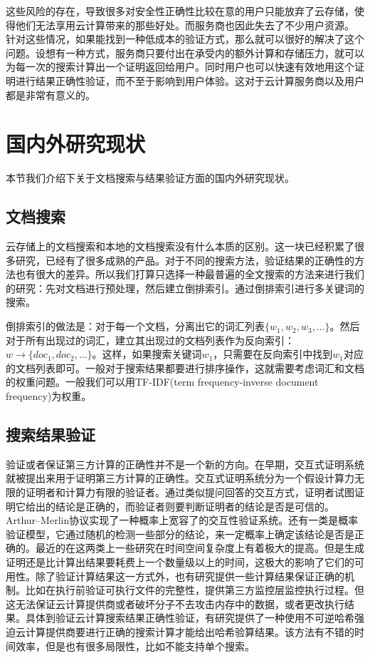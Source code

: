 这些风险的存在，导致很多对安全性正确性比较在意的用户只能放弃了云存储，使得他们无法享用云计算带来的那些好处。而服务商也因此失去了不少用户资源。
针对这些情况，如果能找到一种低成本的验证方式，那么就可以很好的解决了这个问题。设想有一种方式，服务商只要付出在承受内的额外计算和存储压力，就可以为每一次的搜索计算出一个证明返回给用户。同时用户也可以快速有效地用这个证明进行结果正确性验证，而不至于影响到用户体验。这对于云计算服务商以及用户都是非常有意义的。

\section{国内外研究现状}
本节我们介绍下关于文档搜索与结果验证方面的国内外研究现状。

\subsection{文档搜索}
云存储上的文档搜索和本地的文档搜索没有什么本质的区别。这一块已经积累了很多研究，已经有了很多成熟的产品。对于不同的搜索方法，验证结果的正确性的方法也有很大的差异。所以我们打算只选择一种最普遍的全文搜索的方法来进行我们的研究：先对文档进行预处理，然后建立倒排索引。通过倒排索引进行多关键词的搜索。

倒排索引的做法是：对于每一个文档，分离出它的词汇列表$\{w_1,w_2,w_3,...\}$。然后对于所有出现过的词汇，建立其出现过的文档列表作为反向索引：$w \to \{doc_1,doc_2,...\}$。这样，如果搜索关键词$w_1$，只需要在反向索引中找到$w_1$对应的文档列表即可。一般对于搜索结果都要进行排序操作，这就需要考虑词汇和文档的权重问题。一般我们可以用TF-IDF(term frequency-inverse document frequency)为权重。
\subsection{搜索结果验证}
验证或者保证第三方计算的正确性并不是一个新的方向。在早期，交互式证明系统就被提出来用于证明第三方计算的正确性。交互式证明系统分为一个假设计算力无限的证明者和计算力有限的验证者。通过类似提问回答的交互方式，证明者试图证明它给出的结论是正确的，而验证者则要判断证明者的结论是否是可信的。Arthur–Merlin协议实现了一种概率上宽容了的交互性验证系统。还有一类是概率验证模型，它通过随机的检测一些部分的结论，来一定概率上确定该结论是否是正确的。最近的在这两类上一些研究在时间空间复杂度上有着极大的提高。但是生成证明还是比计算出结果要耗费上一个数量级以上的时间，这极大的影响了它们的可用性。除了验证计算结果这一方式外，也有研究提供一些计算结果保证正确的机制。比如在执行前验证可执行文件的完整性，提供第三方监控层监控执行过程。但这无法保证云计算提供商或者破坏分子不去攻击内存中的数据，或者更改执行结果。具体到验证云计算搜索结果正确性验证，有研究提供了一种使用不可逆哈希强迫云计算提供商要进行正确的搜索计算才能给出哈希验算结果。该方法有不错的时间效率，但是也有很多局限性，比如不能支持单个搜索。

